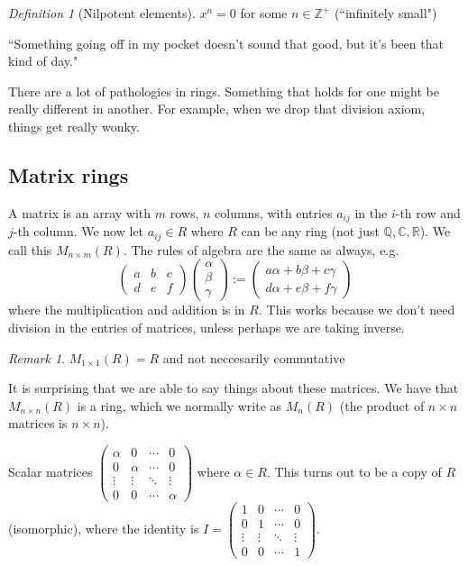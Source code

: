 \documentclass{article}
\theoremstyle{plain}
\theoremstyle{remark}
\newtheorem{definition}{Definition}
\newtheorem{remark}{Remark}
\newcommand{\Z}{{\mathbb Z}}
\newcommand{\Q}{{\mathbb Q}}
\newcommand{\R}{{\mathbb R}}
\newcommand{\C}{{\mathbb C}}
\begin{document}
\begin{definition}[Nilpotent elements]
	$x^n = 0$ for some $n \in \Z^+$ (``infinitely small")
\end{definition}
``Something going off in my pocket doesn't sound that good, but it's been that kind of day."

There are a lot of pathologies in rings.
Something that holds for one might be really different in another.
For example, when we drop that division axiom,
things get really wonky.

\subsection{Matrix rings}
A matrix is an array with $m$ rows, $n$ columns,
with entries $a_{ij}$ in the $i$-th row and $j$-th column.
We now let $a_{ij} \in R$ where $R$ can be any ring (not just $\Q,\C,\R$).
We call this $M_{n\times m}(R)$.
The rules of algebra are the same as always, e.g.
\[
	\begin{pmatrix} a & b & c \\ d & e & f \end{pmatrix}
	\begin{pmatrix} \alpha \\ \beta \\ \gamma \end{pmatrix}
	:= \begin{pmatrix} a \alpha + b \beta + c\gamma \\ d\alpha + e\beta + f \gamma \end{pmatrix}
\]
where the multiplication and addition is in $R$.
This works because we don't need division in the entries of matrices,
unless perhaps we are taking inverse.
\begin{remark}
	$M_{1 \times 1}(R) = R$ and not neccesarily commutative
\end{remark}

It is surprising that we are able to say things about these matrices.
We have that $M_{n \times n}(R)$ is a ring, which we normally write as $M_n(R)$
(the product of $n \times n$ matrices is $n \times n$).

Scalar matrices $\begin{pmatrix} \alpha &0 &\cdots &0\\ 0 & \alpha &\cdots & 0 \\\vdots & \vdots & \ddots & \vdots\\
0 & 0 & \cdots & \alpha \end{pmatrix}$ where $\alpha \in R$.
This turns out to be a copy of $R$ (isomorphic),
where the identity is $I =
\begin{pmatrix} 1 &0 &\cdots &0\\ 0 & 1 &\cdots & 0 \\\vdots & \vdots & \ddots & \vdots\\
0 & 0 & \cdots & 1 \end{pmatrix}$.
\end{document}
